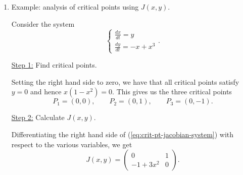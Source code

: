 \documentclass[11pt, letterpaper, oneside]{article}     %
\numberwithin{equation}{subsection}
\theoremstyle{definition}
\numberwithin{theorem}{section}
\theoremstyle{remark}
\newcommand{\ds}{\displaystyle}
\begin{document}
\begin{enumerate}
  Now let's consider the very closely related\\
  3.
  \begin{equation*}
    \begin{cases}
      x' = y + x(x^2+y^2)\\
      y' = -x + y(x^2+y^2)
    \end{cases}.
  \end{equation*}
  Again it is easy to see that the corresponding linear system is given by (1) above (all we did was flip the sign of the nonlinear terms). However, this system displays even more disparate behaviour. By the same analysis as above, we find that $\ds\frac{dr}{dt} = r^3 > 0$ for all $r$, and hence the nonzero solution curves all diverge to infinity. In this case, the origin as an unstable source.

  The message to take away from this example is while the behaviour of linearised systems generally carries over to that of the nonlinear system, it tells one absolutely nothing if the critical point is a centre of the linear system (the coefficient matrix has purely imaginary eigenvalues).

  \medskip

\item Example: analysis of critical points using $J(x,y)$.

  Consider the system
  \begin{equation}\label{eq:crit-pt-jacobian-system}
    \begin{cases}
      \frac{dx}{dt} = y\\
      \frac{dy}{dt} = -x+x^3
    \end{cases}.
  \end{equation}

  \underline{Step 1:} Find critical points.

  Setting the right hand side to zero, we have that all critical points satisfy $y = 0$ and hence $x(1-x^2) = 0$. This gives us the three critical points
  \begin{equation}
    P_1 = (0,0), \quad\quad
    P_2 = (0,1), \quad\quad
    P_3 = (0,-1).
  \end{equation}

  \underline{Step 2:} Calculate $J(x,y)$.

  Differentiating the right hand side of (\ref{eq:crit-pt-jacobian-system}) with respect to the various variables, we get
  \begin{equation}
    J(x,y) =
    \begin{pmatrix}
      0 & 1\\
      -1+3x^2 & 0
    \end{pmatrix}.
  \end{equation}


\end{enumerate}
\end{document}
